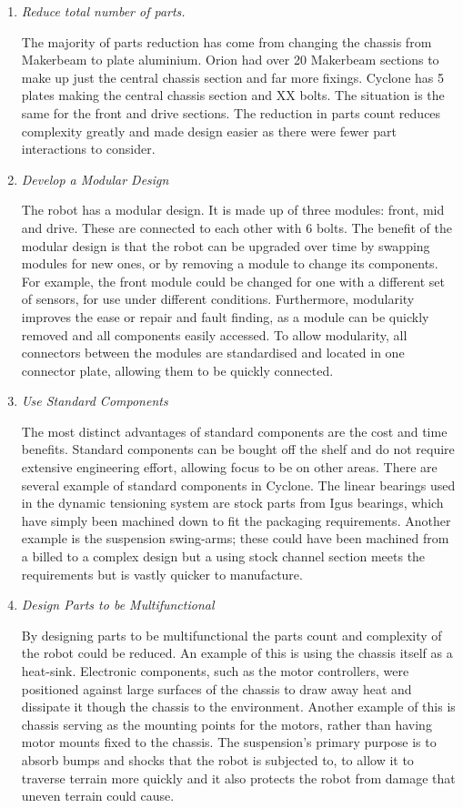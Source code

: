 \begin{enumerate}
\item \textit{Reduce total number of parts.}
\par The majority of parts reduction has come from changing the chassis from Makerbeam to plate aluminium. Orion had over 20 Makerbeam sections to make up just the central chassis section and far more fixings. Cyclone has 5 plates making the central chassis section and XX bolts. The situation is the same for the front and drive sections. The reduction in parts count reduces complexity greatly and made design easier as there were fewer part interactions to consider.
\item \textit{Develop a Modular Design}
\par The robot has a modular design. It is made up of three modules: front, mid and drive. These are connected to each other with 6 bolts. The benefit of the modular design is that the robot can be upgraded over time by swapping modules for new ones, or by removing a module to change its components. For example, the front module could be changed for one with a different set of sensors, for use under different conditions. Furthermore, modularity improves the ease or repair and fault finding, as a module can be quickly removed and all components easily accessed. To allow modularity, all connectors between the modules are standardised and located in one connector plate, allowing them to be quickly connected.
\item \textit{Use Standard Components}
\par The most distinct advantages of standard components are the cost and time benefits. Standard components can be bought off the shelf and do not require extensive engineering effort, allowing focus to be on other areas. There are several example of standard components in Cyclone. The linear bearings used in the dynamic tensioning system are stock parts from Igus bearings, which have simply been machined down to fit the packaging requirements. Another example is the suspension swing-arms; these could have been machined from a billed to a complex design but a using stock channel section meets the requirements but is vastly quicker to manufacture.
\item \textit{Design Parts to be Multifunctional}
\par By designing parts to be multifunctional the parts count and complexity of the robot could be reduced. An example of this is using the chassis itself as a heat-sink. Electronic components, such as the motor controllers, were positioned against large surfaces of the chassis to draw away heat and dissipate it though the chassis to the environment. Another example of this is chassis serving as the mounting points for the motors, rather than having motor mounts fixed to the chassis. The suspension’s primary purpose is to absorb bumps and shocks that the robot is subjected to, to allow it to traverse terrain more quickly and it also protects the robot from damage that uneven terrain could cause.

\end{enumerate}
